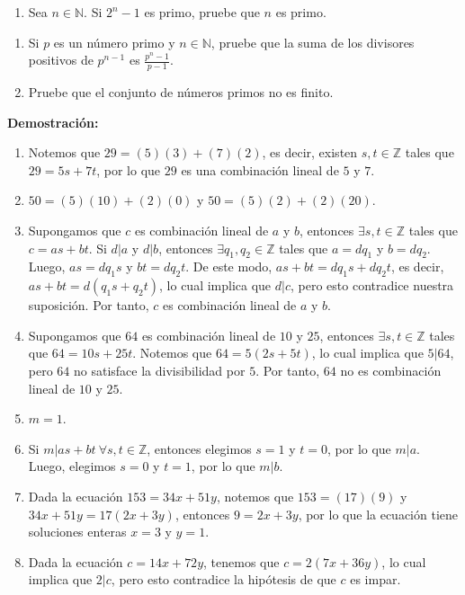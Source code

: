 \documentclass[11pt]{article}
\newcommand{\N}{\mathbb{N}}
\newcommand{\Z}{\mathbb{Z}}
\begin{document}
\begin{enumerate}[start=40]
  \item Sea $n\in \N$. Si $2^n-1$ es primo, pruebe que $n$ es primo.
\end{enumerate}

\begin{enumerate}[start=43]
  \item Si $p$ es un número primo y $n\in \N$, pruebe que la suma de los divisores positivos de $p^{n-1}$ es $\frac{p^n-1}{p-1}$.
  \item Pruebe que el conjunto de números primos no es finito.
\end{enumerate}



\textbf{Demostración:}
\begin{enumerate}[label=1.\arabic*]
  \item Notemos que $29=(5)(3)+(7)(2)$, es decir, existen $s,t \in \Z$ tales que $29=5s+7t$, por lo que $29$ es una combinación lineal de $5$ y $7$.
  \item $50=(5)(10)+(2)(0)$ y $50=(5)(2)+(2)(20)$.
  \item Supongamos que $c$ es combinación lineal de $a$ y $b$, entonces $\exists s,t\in \Z$ tales que $c=as+bt$. Si $d|a$ y $d|b$, entonces $\exists q_1,q_2\in \Z$ tales que $a=dq_1$ y $b=dq_2$. Luego, $as=dq_1s$ y $bt=dq_2t$. De este modo, $as+bt=dq_1s+dq_2t$, es decir, $as+bt=d(q_1s+q_2t)$, lo cual implica que $d|c$, pero esto contradice nuestra suposición. Por tanto, $c$ es combinación lineal de $a$ y $b$.
  \item Supongamos que $64$ es combinación lineal de $10$ y $25$, entonces $\exists s,t\in \Z$ tales que $64=10s+25t$. Notemos que $64=5(2s+5t)$, lo cual implica que $5|64$, pero $64$ no satisface la divisibilidad por $5$. Por tanto, $64$ no es combinación lineal de $10$ y $25$.
  \item $m=1$.
  \item Si $m|as+bt \ \forall s,t\in\Z$, entonces elegimos $s=1$ y $t=0$, por lo que $m|a$. Luego, elegimos $s=0$ y $t=1$, por lo que $m|b$.
  \item Dada la ecuación $153=34x+51y$, notemos que $153=(17)(9)$ y $34x+51y=17(2x+3y)$, entonces $9=2x+3y$, por lo que la ecuación tiene soluciones enteras $x=3$ y $y=1$.
  \item Dada la ecuación $c=14x+72y$, tenemos que $c=2(7x+36y)$, lo cual implica que $2|c$, pero esto contradice la hipótesis de que $c$ es impar.
\end{enumerate}
\end{document}
